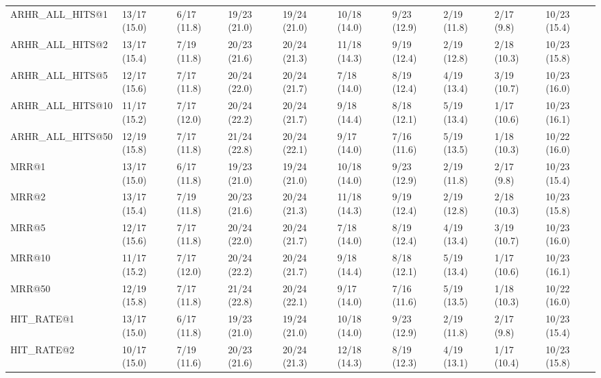 \begin{tabular}{llllllllll}
ARHR_ALL_HITS@1             &   13/17 (15.0) &    6/17 (11.8) &      19/23 (21.0) &   19/24 (21.0) &  10/18 (14.0) &    9/23 (12.9) &         2/19 (11.8) &   2/17 (9.8) &  10/23 (15.4) \\
ARHR_ALL_HITS@2             &   13/17 (15.4) &    7/19 (11.8) &      20/23 (21.6) &   20/24 (21.3) &  11/18 (14.3) &    9/19 (12.4) &         2/19 (12.8) &  2/18 (10.3) &  10/23 (15.8) \\
ARHR_ALL_HITS@5             &   12/17 (15.6) &    7/17 (11.8) &      20/24 (22.0) &   20/24 (21.7) &   7/18 (14.0) &    8/19 (12.4) &         4/19 (13.4) &  3/19 (10.7) &  10/23 (16.0) \\
ARHR_ALL_HITS@10            &   11/17 (15.2) &    7/17 (12.0) &      20/24 (22.2) &   20/24 (21.7) &   9/18 (14.4) &    8/18 (12.1) &         5/19 (13.4) &  1/17 (10.6) &  10/23 (16.1) \\
ARHR_ALL_HITS@50            &   12/19 (15.8) &    7/17 (11.8) &      21/24 (22.8) &   20/24 (22.1) &   9/17 (14.0) &    7/16 (11.6) &         5/19 (13.5) &  1/18 (10.3) &  10/22 (16.0) \\
MRR@1                       &   13/17 (15.0) &    6/17 (11.8) &      19/23 (21.0) &   19/24 (21.0) &  10/18 (14.0) &    9/23 (12.9) &         2/19 (11.8) &   2/17 (9.8) &  10/23 (15.4) \\
MRR@2                       &   13/17 (15.4) &    7/19 (11.8) &      20/23 (21.6) &   20/24 (21.3) &  11/18 (14.3) &    9/19 (12.4) &         2/19 (12.8) &  2/18 (10.3) &  10/23 (15.8) \\
MRR@5                       &   12/17 (15.6) &    7/17 (11.8) &      20/24 (22.0) &   20/24 (21.7) &   7/18 (14.0) &    8/19 (12.4) &         4/19 (13.4) &  3/19 (10.7) &  10/23 (16.0) \\
MRR@10                      &   11/17 (15.2) &    7/17 (12.0) &      20/24 (22.2) &   20/24 (21.7) &   9/18 (14.4) &    8/18 (12.1) &         5/19 (13.4) &  1/17 (10.6) &  10/23 (16.1) \\
MRR@50                      &   12/19 (15.8) &    7/17 (11.8) &      21/24 (22.8) &   20/24 (22.1) &   9/17 (14.0) &    7/16 (11.6) &         5/19 (13.5) &  1/18 (10.3) &  10/22 (16.0) \\
HIT_RATE@1                  &   13/17 (15.0) &    6/17 (11.8) &      19/23 (21.0) &   19/24 (21.0) &  10/18 (14.0) &    9/23 (12.9) &         2/19 (11.8) &   2/17 (9.8) &  10/23 (15.4) \\
HIT_RATE@2                  &   10/17 (15.0) &    7/19 (11.6) &      20/23 (21.6) &   20/24 (21.3) &  12/18 (14.3) &    8/19 (12.3) &         4/19 (13.1) &  1/17 (10.4) &  10/23 (15.8) \\

\end{tabular}
